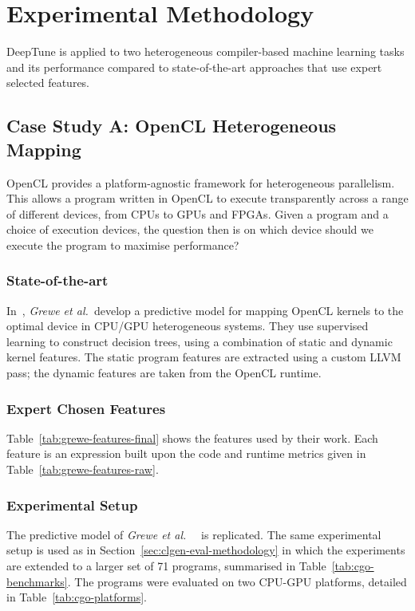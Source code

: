\section{Experimental Methodology}
\label{sec:deeptune-methodology}

DeepTune is applied to two heterogeneous compiler-based machine learning tasks and its performance compared to state-of-the-art approaches that use expert selected features.


\subsection{Case Study A: OpenCL Heterogeneous Mapping}

OpenCL provides a platform-agnostic framework for heterogeneous parallelism. This allows a program written in OpenCL to execute transparently across a range of different devices, from CPUs to GPUs and FPGAs. Given a program and a choice of execution devices, the question then is on which device should we execute the program to maximise performance?

\subsubsection{State-of-the-art}

In~\cite{Grewe2013}, \emph{Grewe et al.\ }develop a predictive model for mapping OpenCL kernels to the optimal device in CPU/GPU heterogeneous systems. They use supervised learning to construct decision trees, using a combination of static and dynamic kernel features. The static program features are extracted using a custom LLVM pass; the dynamic features are taken from the OpenCL runtime.

\subsubsection{Expert Chosen Features}

Table~\ref{tab:grewe-features-final} shows the features used by their work. Each feature is an expression built upon the code and runtime metrics given in Table~\ref{tab:grewe-features-raw}.



\subsubsection{Experimental Setup}

The predictive model of \emph{Grewe et al.\ }~\cite{Grewe2013} is replicated. The same experimental setup is used as in Section~\ref{sec:clgen-eval-methodology} in which the experiments are extended to a larger set of 71 programs, summarised in Table~\ref{tab:cgo-benchmarks}. The programs were evaluated on two CPU-GPU platforms, detailed in Table~\ref{tab:cgo-platforms}.


